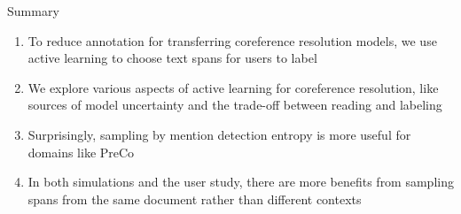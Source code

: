 \begin{frame}{Summary}
\begin{enumerate}
\item To reduce annotation for transferring coreference resolution models, we use active learning to choose text spans for users to label
\item We explore various aspects of active learning for coreference resolution,
    like sources of
model uncertainty and the trade-off between reading and labeling
\item Surprisingly, sampling by mention detection entropy is more useful for domains like
PreCo
\item In both simulations and the user study,
there are more benefits from sampling spans from the same document rather than different
contexts
\end{enumerate}
\end{frame}

